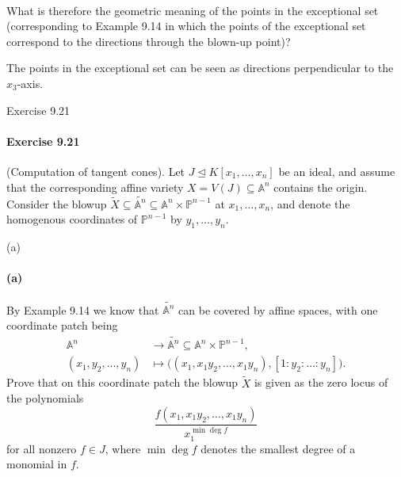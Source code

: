 \documentclass[12pt]{article}
\newenvironment{fullbox}{\begin{lrbox}{\savefullbox}\begin{minipage}{\dimexpr\textwidth-2\fboxsep\relax}}{\end{minipage}\end{lrbox}\begin{center}\framebox[\textwidth]{\usebox{\savefullbox}}\end{center}}
\newenvironment{pbox}[1][]{\begin{fullbox}\ifx#1\empty\else\paragraph{#1}\fi}{\end{fullbox}}
\theoremstyle{definition}
\newcommand{\<}{\langle}
\renewcommand{\>}{\rangle}
\newcommand{\A}{\mathbb{A}}
\renewcommand{\P}{\mathbb{P}}
\newcommand{\teq}{\trianglelefteq}
\newcommand{\blow}{\widetilde}
\newcommand{\belt}[2]{\big((#1), [#2]\big)}
\begin{document}
\begin{pbox}
    What is therefore the geometric meaning of the points in the exceptional set (corresponding to Example 9.14 in which the points of the exceptional set correspond to the directions through the blown-up point)?
\end{pbox}

The points in the exceptional set can be seen as directions perpendicular to the $x_3$-axis.


\newpage
\begin{pbox}[Exercise 9.21]
    (Computation of tangent cones). Let $J \teq K[x_1, \dots, x_n]$ be an ideal, and assume that the corresponding affine variety $X = V(J) \subseteq \A^n$ contains the origin. Consider the blowup $\blow{X} \subseteq \blow{\A^n} \subseteq \A^n \times \P^{n-1}$ at $x_1, \dots, x_n$, and denote the homogenous coordinates of $\P^{n-1}$ by $y_1, \dots, y_n$.
\end{pbox}

\begin{pbox}[(a)]
    By Example 9.14 we know that $\blow{\A^n}$ can be covered by affine spaces, with one coordinate patch being
    \begin{align*}
        \A^n &\to \blow{\A^n} \subseteq \A^n \times \P^{n-1}, \\
        (x_1, y_2, \dots, y_n) &\mapsto \belt{x_1, x_1y_2, \dots, x_1y_n}{1 : y_2 : \dots : y_n}.
    \end{align*}
    Prove that on this coordinate patch the blowup $\blow{X}$ is given as the zero locus of the polynomials
    \[
        \frac{f(x_1, x_1y_2, \dots, x_1y_n)}{x_1^{\min\deg f}}
    \]
    for all nonzero $f \in J$, where $\min\deg f$ denotes the smallest degree of a monomial in $f$.
\end{pbox}
\end{document}
